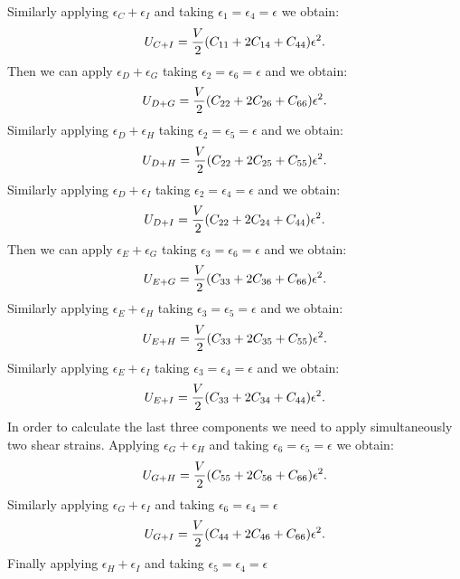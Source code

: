 \documentclass[12pt,a4paper]{article}
\begin{document}
Similarly applying $\epsilon_C + \epsilon_I$ and taking
$\epsilon_1=\epsilon_4=\epsilon$ we obtain:
\begin{equation}
U_{C+I}= {V \over 2} (C_{11}+2 C_{14} + C_{44}) \epsilon^2.
\end{equation}
Then we can apply $\epsilon_D + \epsilon_G$ taking
$\epsilon_2=\epsilon_6=\epsilon$ and we obtain:
\begin{equation}
U_{D+G}= {V \over 2} (C_{22}+2 C_{26} + C_{66}) \epsilon^2.
\end{equation}
Similarly applying $\epsilon_D + \epsilon_H$ taking
$\epsilon_2=\epsilon_5=\epsilon$ and we obtain:
\begin{equation}
U_{D+H}= {V \over 2} (C_{22}+2 C_{25} + C_{55}) \epsilon^2.
\end{equation}
Similarly applying $\epsilon_D + \epsilon_I$ taking
$\epsilon_2=\epsilon_4=\epsilon$ and we obtain:
\begin{equation}
U_{D+I}= {V \over 2} (C_{22}+2 C_{24} + C_{44}) \epsilon^2.
\end{equation}
Then we can apply $\epsilon_E + \epsilon_G$ taking
$\epsilon_3=\epsilon_6=\epsilon$ and we obtain:
\begin{equation}
U_{E+G}= {V \over 2} (C_{33}+2 C_{36} + C_{66}) \epsilon^2.
\end{equation}
Similarly applying $\epsilon_E + \epsilon_H$ taking
$\epsilon_3=\epsilon_5=\epsilon$ and we obtain:
\begin{equation}
U_{E+H}= {V \over 2} (C_{33}+2 C_{35} + C_{55}) \epsilon^2.
\end{equation}
Similarly applying $\epsilon_E + \epsilon_I$ taking
$\epsilon_3=\epsilon_4=\epsilon$ and we obtain:
\begin{equation}
U_{E+I}= {V \over 2} (C_{33}+2 C_{34} + C_{44}) \epsilon^2.
\end{equation}
In order to calculate the last three components we need to apply
simultaneously two shear strains. Applying $\epsilon_G + \epsilon_H$ 
and taking $\epsilon_6=\epsilon_5=\epsilon$ we obtain:
\begin{equation}
U_{G+H}= {V \over 2} (C_{55}+2 C_{56} + C_{66}) \epsilon^2.
\end{equation}
Similarly applying $\epsilon_G + \epsilon_I$
and taking $\epsilon_6=\epsilon_4=\epsilon$
\begin{equation}
U_{G+I}= {V \over 2} (C_{44}+2 C_{46} + C_{66}) \epsilon^2.
\end{equation}
Finally applying $\epsilon_H + \epsilon_I$
and taking $\epsilon_5=\epsilon_4=\epsilon$
\end{document}
